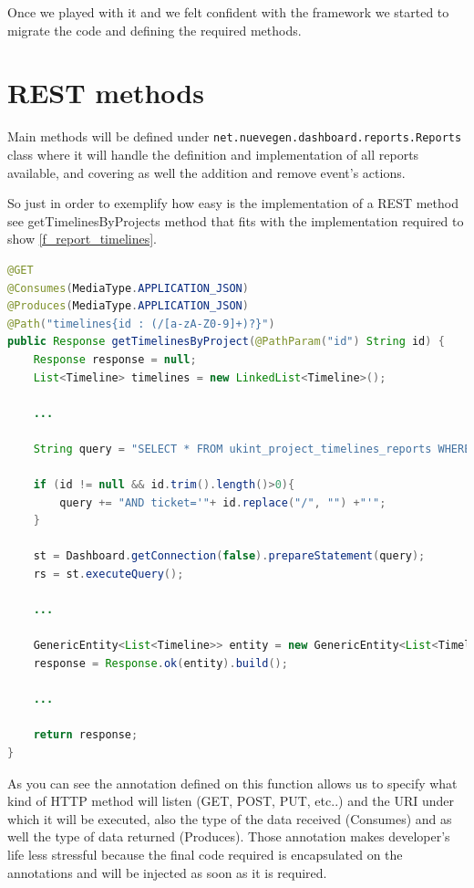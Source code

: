 Once we played with it and we felt confident with the framework we started
to migrate the code and defining the required methods.

\section{REST methods}
Main methods will be defined under
\texttt{net.nuevegen.dashboard.reports.Reports} class where it will handle
the definition and implementation of all reports available, and covering as well
the addition and remove event's actions. 

So just in order to exemplify how easy is the implementation of a REST method
see getTimelinesByProjects method that fits with the implementation required to
show \ref{f_report_timelines}.\\

\begin{lstlisting}[language=Java,breaklines=true,caption=Reports.getTimelinesByProjects(),label=f_migration_gettimelines]
@GET
@Consumes(MediaType.APPLICATION_JSON)
@Produces(MediaType.APPLICATION_JSON)
@Path("timelines{id : (/[a-zA-Z0-9]+)?}")
public Response getTimelinesByProject(@PathParam("id") String id) {
	Response response = null;
	List<Timeline> timelines = new LinkedList<Timeline>(); 

	...
	
	String query = "SELECT * FROM ukint_project_timelines_reports WHERE 1 ";

	if (id != null && id.trim().length()>0){
		query += "AND ticket='"+ id.replace("/", "") +"'";
	}
	
	st = Dashboard.getConnection(false).prepareStatement(query);
	rs = st.executeQuery();
	
	...
	
	GenericEntity<List<Timeline>> entity = new GenericEntity<List<Timeline>>(timelines) {};
	response = Response.ok(entity).build();
	
	...
	
	return response;
}
\end{lstlisting}

As you can see the annotation defined on this function allows us to specify what
kind of HTTP method will listen (GET, POST, PUT, etc..) and the URI under which
it will be executed, also the type of the data received (Consumes) and as well
the type of data returned (Produces). Those annotation makes developer's
life less stressful because the final code required is encapsulated on the
annotations and will be injected as soon as it is required.

